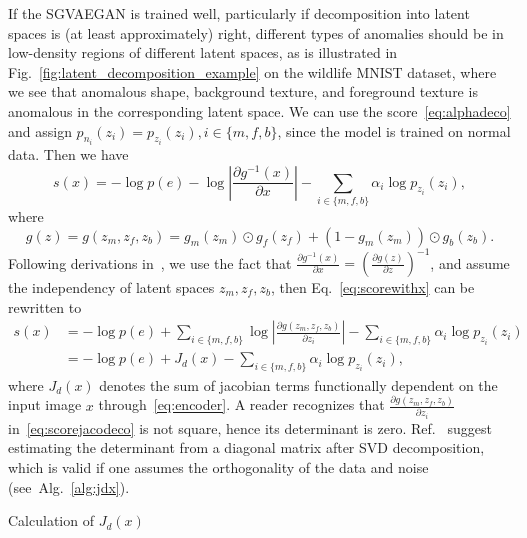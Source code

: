 If the SGVAEGAN is trained well, particularly if decomposition into latent spaces is (at least approximately) right, different types of anomalies should be in low-density regions of different latent spaces, as is illustrated in Fig.~\ref{fig:latent_decomposition_example} on the wildlife MNIST dataset, where we see that anomalous shape, background texture, and foreground texture is anomalous in the corresponding latent space. We can use the score~\eqref{eq:alphadeco} and assign $p_{n_i}(z_i) = p_{z_i}(z_i), i \in \lbrace m,f,b \rbrace$, since the model is trained on normal data. Then we have
\begin{equation}
s(x) = - \log p(e)  - \log\left\vert \frac{\partial g^{-1}(x)}{\partial x}\right\vert -  \sum_{i\in\{m,f,b\}}\alpha_{i}\log p_{z_{i}}(z_{i}),	
\label{eq:scorewithx}
\end{equation}
where
\begin{equation}
g(z) = g(z_m, z_f, z_b) = g_m(z_m) \odot g_f(z_f) + (1 - g_m(z_m)) \odot g_b(z_b).
\end{equation}
Following derivations in~\cite{vsmidl2019anomaly}, we use the fact that $\frac{\partial g^{-1}(x)}{\partial x} = \left( \frac{\partial g(z)}{\partial z} \right) ^{-1}$, and assume the independency of latent spaces $z_m, z_f, z_b$, then Eq.~\eqref{eq:scorewithx} can be rewritten to 
\begin{align} \label{eq:scorejacodeco}	
s(x) & = - \log p(e)  + \sum_{i\in\{m,f,b\}} \log\left\vert \frac{\partial g(z_m, z_f, z_b)}{\partial z_i}\right\vert -  \sum_{i\in\{m,f,b\}} \alpha_{i}\log p_{z_{i}}(z_{i}) \\
& = - \log p(e)  + J_d(x) -  \sum_{i\in\{m,f,b\}} \alpha_{i}\log p_{z_{i}}(z_{i}),
\end{align}
where $J_d(x)$ denotes the sum of jacobian terms functionally dependent on the input image $x$ through~\eqref{eq:encoder}. A reader recognizes that $\frac{\partial g(z_m, z_f, z_b)}{\partial z_i}$ in~\eqref{eq:scorejacodeco} is not square, hence its determinant is zero. Ref.~\cite{vsmidl2019anomaly} suggest estimating the determinant from a diagonal matrix after SVD decomposition, which is valid if one assumes the orthogonality of the data and noise (see~Alg.~\ref{alg:jdx}).

\algrenewcommand\textproc{} 
\begin{algorithm}
\caption{Calculation of $J_d(x)$}\label{alg:jdx}

\end{algorithm}

